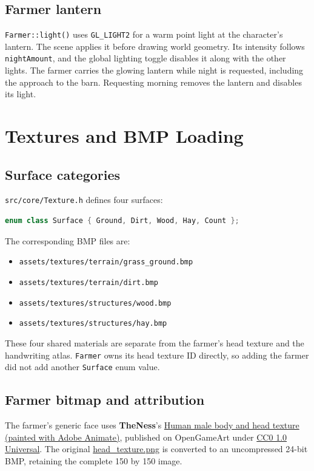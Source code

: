 \documentclass[11pt,a4paper,openany]{book}
\newcommand{\code}[1]{\texttt{#1}}
\newcommand{\file}[1]{\nolinkurl{#1}}
\newcommand{\keycap}[1]{\begingroup\setlength{\fboxsep}{0.8pt}\raisebox{0.05ex}{\fbox{\footnotesize\texttt{#1}}}\endgroup}
\begin{document}
\section{Farmer lantern}
\code{Farmer::light()} uses \code{GL\_LIGHT2} for a warm point light at the character's lantern. The scene applies it before drawing world geometry. Its intensity follows \code{nightAmount}, and the global lighting toggle \keycap{L} disables it along with the other lights. The farmer carries the glowing lantern while night is requested, including the approach to the barn. Requesting morning removes the lantern and disables its light.

\chapter{Textures and BMP Loading}
\section{Surface categories}
\file{src/core/Texture.h} defines four surfaces:
\begin{lstlisting}[language=C++]
enum class Surface { Ground, Dirt, Wood, Hay, Count };
\end{lstlisting}
The corresponding BMP files are:
\begin{itemize}
	\item \file{assets/textures/terrain/grass\_ground.bmp}
	\item \file{assets/textures/terrain/dirt.bmp}
	\item \file{assets/textures/structures/wood.bmp}
	\item \file{assets/textures/structures/hay.bmp}
\end{itemize}

These four shared materials are separate from the farmer's head texture and the handwriting atlas. \code{Farmer} owns its head texture ID directly, so adding the farmer did not add another \code{Surface} enum value.

\section{Farmer bitmap and attribution}
The farmer's generic face uses \textbf{TheNess}'s \href{https://opengameart.org/content/human-male-body-and-head-texture-painted-with-adobe-animate}{Human male body and head texture (painted with Adobe Animate)}, published on OpenGameArt under \href{https://creativecommons.org/publicdomain/zero/1.0/}{CC0 1.0 Universal}. The original \href{https://opengameart.org/sites/default/files/head_texture.png}{head\_texture.png} is converted to an uncompressed 24-bit BMP, retaining the complete 150 by 150 image.
\end{document}
